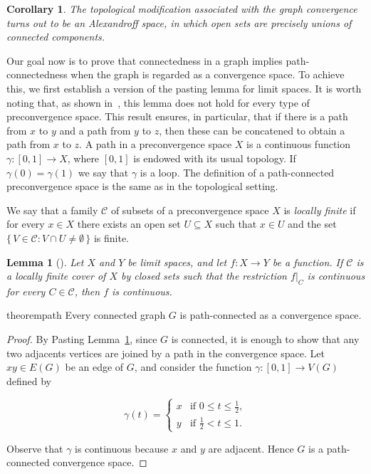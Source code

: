\documentclass{amsart}
\newtheorem{lemma}{Lemma}[section]
\newtheorem{corollary}{Corollary}[section]
\theoremstyle{definition}
\theoremstyle{remark}
\numberwithin{equation}{section}
\begin{document}
\begin{corollary}
	\label{topmod}
	The topological modification associated with the graph convergence turns out to be an Alexandroff space, in which open sets are precisely unions of connected components.
\end{corollary}

Our goal now is to prove that connectedness in a graph implies path-connectedness when the graph is regarded as a convergence space. To achieve this, we first establish a version of the pasting lemma for limit spaces. It is worth noting that, as shown in~\cite{preuss}, this lemma does not hold for every type of preconvergence space. This result ensures, in particular, that if there is a path from $x$ to $y$ and a path from $y$ to $z$, then these can be concatened to obtain a path from $x$ to $z$.
A path in a preconvergence space $X$ is a continuous function $\gamma\colon[0,1]\to X$, where $[0,1]$ is endowed with its usual topology. If $\gamma(0)=\gamma(1)$ we say that $\gamma$ is a loop. The definition of a path-connected preconvergence space is the same as in the topological setting.

We say that a family $\mathcal{C}$ of subsets of a preconvergence space $X$ is \emph{locally finite} if for every $x \in X$ there exists an open set $U \subseteq X$ such that $x \in U$ and the set
$
\{\, V \in \mathcal{C} : V \cap U \neq \emptyset \,\}
$
is finite.

\begin{lemma}[{\cite[Lemma 3.2]{nettopology}}]
	\label{pastinglemma}
	Let $X$ and $Y$ be limit spaces, and let $f\colon X\to Y$ be a function. If $\mathcal{C}$ is a locally finite cover of $X$ by closed sets such that the restriction $f|_C$ is continuous for every $C \in \mathcal{C}$, then $f$ is continuous.
\end{lemma}
\begin{restatable}{theorem}{path}
	\label{path}
	Every connected graph $G$ is path-connected as a convergence space.
\end{restatable}
\begin{proof}
	By Pasting Lemma~\ref{pastinglemma}, since $G$ is connected, it is enough to show that any two adjacents vertices are joined by a path in the convergence space. Let $xy\in E(G)$ be an edge of $G$, and consider the function $\gamma:[0,1]\to V(G)$ defined by
	
	\[
	\gamma(t)=
	\begin{cases}
		x & \text{if } 0\leq t\le \tfrac{1}{2},\\[6pt]
		y & \text{if } \tfrac{1}{2}< t\le 1.
	\end{cases}
	\]
	
	
	Observe that $\gamma$ is continuous because $x$ and $y$ are adjacent. Hence $G$ is a path-connected convergence space.
\end{proof}
\end{document}
